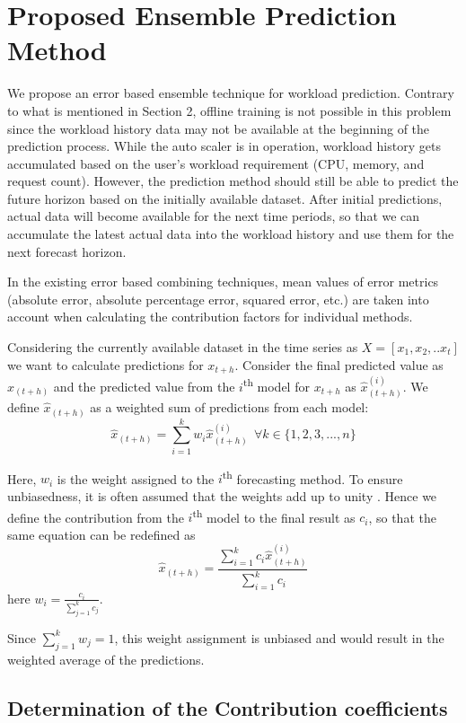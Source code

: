 \section{Proposed Ensemble Prediction Method}

We propose an error based ensemble technique for workload prediction. Contrary to what is mentioned in Section 2, offline training is not possible in this problem since the workload history data may not be available at the beginning of the prediction process. While the auto scaler is in operation, workload history gets accumulated based on the user's workload requirement (CPU, memory, and request count). However, the prediction method should still be able to predict the future horizon based on the initially available dataset. After initial predictions, actual data will become available for the next time periods, so that we can accumulate the latest actual data into the workload history and use them for the next forecast horizon.

In the existing error based combining techniques, mean values of error metrics (absolute error, absolute percentage error, squared error, etc.) are taken into account when calculating the contribution factors for individual methods. 

Considering the currently available dataset in the time series as
$X=[x_{1},x_{2},.. x_{t}]$
we want to calculate predictions for $x_{t+h}$. Consider the final predicted value as $\hat{x}_{(t+h)}$ and the predicted value from the $i$\textsuperscript{th} model for $x_{t+h}$ as $\hat{x}_{(t+h)}^{(i)}$. We define $\hat{x}_{(t+h)}$ as a weighted sum of predictions from each model:
$$\hat{x}_{(t+h)}= \sum_{i=1}^{k}w_i \hat{x}_{(t+h)}^{(i)} \ \ \forall k \in \{1,2,3,...,n\}$$

Here, $w_i$ is the weight assigned to the $i$\textsuperscript{th} forecasting method. To ensure unbiasedness, it is often assumed that the weights add up to unity \cite{Adhikari_2012}. Hence we define the contribution from the $i$\textsuperscript{th} model to the final result as $c_i$, so that the same equation can be redefined as  
$$\hat{x}_{(t+h)}= \frac{\sum_{i=1}^{k}c_i \hat{x}_{(t+h)}^{(i)}}{\sum_{i=1}^{k}c_i}$$
here $w_{i}= \frac{c_{i}}{\sum_{j=1}^{k}c_j}$.

Since $\sum_{j=1}^{k}w_{j}=1$, this weight assignment is unbiased and would result in the weighted average of the predictions.

\subsection{Determination of the Contribution coefficients}

